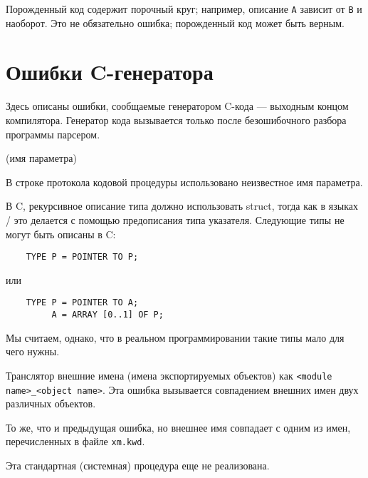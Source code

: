 
Порожденный код содержит порочный круг; например, 
описание \verb'A' зависит от \verb'B' и наоборот.
Это не обязательно ошибка; порожденный код может быть верным.

\section{Ошибки C-генератора}

Здесь описаны ошибки, сообщаемые генератором C-кода --- 
выходным концом компилятора. Генератор кода вызывается только
после безошибочного разбора программы парсером.

(имя параметра)

В строке протокола кодовой процедуры использовано неизвестное имя
параметра.


В C, рекурсивное описание типа должно использовать
struct, тогда как в языках
\mt{}/\ot{} это делается с помощью предописания типа указателя.
Следующие типы не могут быть описаны в C:

\verb'    TYPE P = POINTER TO P;'

или

\verb'    TYPE P = POINTER TO A;'\\
\verb'         A = ARRAY [0..1] OF P;'

Мы считаем, однако, что в реальном программировании такие типы 
мало для чего нужны.


Транслятор внешние имена (имена экспортируемых объектов) как
\verb'<module name>_<object name>'. Эта ошибка вызывается совпадением
внешних имен двух различных объектов.


То же, что и предыдущая ошибка, но внешнее имя совпадает с одним из имен,
перечисленных в файле \verb'xm.kwd'.


Эта стандартная (системная) процедура еще не реализована.


